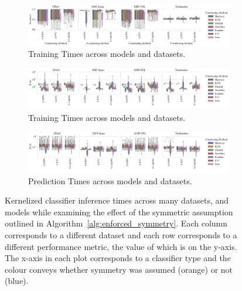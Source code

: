 \documentclass[conference]{IEEEtran}
\begin{document}
\begin{figure}[htb]
    \begin{subfigure}[htb]{\textwidth}
        \centering
        \includegraphics[width=\textwidth]{figs/combined/condensing_methods_vs_accuracy.pdf}
        \caption{Training Times across models and datasets.}
        \label{fig:condense_acc}
    \end{subfigure}
    \begin{subfigure}[htb]{\textwidth}
        \centering
        \includegraphics[width=\textwidth]{figs/combined/condensing_methods_vs_train_time.pdf}
        \caption{Training Times across models and datasets.}
        \label{fig:condense_train_time}
    \end{subfigure}
    \begin{subfigure}[htb]{\textwidth}
        \includegraphics[width=\textwidth]{figs/combined/condensing_methods_vs_predict_time.pdf}
        \caption{Prediction Times across models and datasets.}
        \label{fig:condense_pred_time}
    \end{subfigure}
    \caption{Kernelized classifier inference times across many datasets, and models while examining the effect of the symmetric assumption outlined in Algorithm~\ref{alg:enforced_symmetry}. Each column corresponds to a different dataset and each row corresponds to a different performance metric, the value of which is on the y-axis. The x-axis in each plot corresponds to a classifier type and the colour conveys whether symmetry was assumed (orange) or not (blue).}
    \label{fig:condense_summary}
\end{figure}
\end{document}

